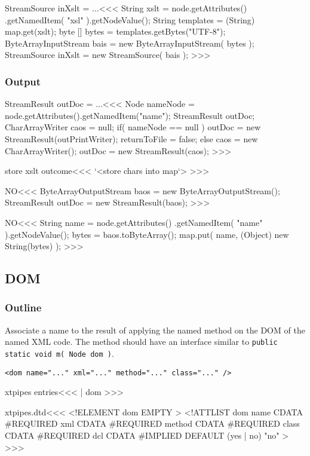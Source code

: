 \documentclass{article}
\begin{document}
{\<StreamSource inXslt = ...\><<<
String xslt = node.getAttributes()
                  .getNamedItem( "xsl" ).getNodeValue();
String templates = (String) map.get(xslt);
byte [] bytes = templates.getBytes("UTF-8");
ByteArrayInputStream bais =  new ByteArrayInputStream( bytes );
StreamSource inXslt = new StreamSource( bais );
>>>


\subsubsection{Output}



\<StreamResult outDoc = ...\><<<
Node nameNode = node.getAttributes().getNamedItem("name");
StreamResult outDoc;
CharArrayWriter caos = null;
if( nameNode == null ){
   outDoc = new StreamResult(outPrintWriter);
   returnToFile = false;
} else {
   caos = new CharArrayWriter();
   outDoc  = new StreamResult(caos);
}
>>>


\<store xslt outcome\><<<
`<store chars into map`>
>>>





\<NO\><<<
ByteArrayOutputStream baos = new ByteArrayOutputStream();
StreamResult outDoc  = new StreamResult(baos);
>>>


\<NO\><<<
String name = node.getAttributes()
                .getNamedItem( "name" ).getNodeValue();
bytes = baos.toByteArray();
map.put( name, (Object) new String(bytes) );
>>>


\subsection{DOM}


\subsubsection{Outline}


Associate a name to the result of applying the named method on the DOM
of the named XML code. The method should have an interface similar to
\verb+public static void m( Node dom )+.

\begin{verbatim}
<dom name="..." xml="..." method="..." class="..." />
\end{verbatim}


\<xtpipes entries\><<<
| dom
>>>


\<xtpipes.dtd\><<<
<!ELEMENT dom EMPTY >  
<!ATTLIST dom
          name   CDATA #REQUIRED 
          xml    CDATA #REQUIRED 
          method CDATA #REQUIRED 
          class  CDATA #REQUIRED 
          dcl    CDATA #IMPLIED DEFAULT (yes | no) "no"
>
>>>



}
\end{document}
